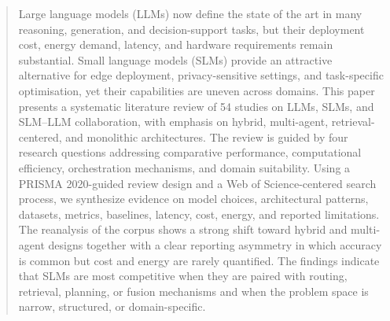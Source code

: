 \begin{abstract}
Large language models (LLMs) now define the state of the art in many reasoning, generation, and decision-support tasks, but their deployment cost, energy demand, latency, and hardware requirements remain substantial. Small language models (SLMs) provide an attractive alternative for edge deployment, privacy-sensitive settings, and task-specific optimisation, yet their capabilities are uneven across domains. This paper presents a systematic literature review of 54 studies on LLMs, SLMs, and SLM--LLM collaboration, with emphasis on hybrid, multi-agent, retrieval-centered, and monolithic architectures. The review is guided by four research questions addressing comparative performance, computational efficiency, orchestration mechanisms, and domain suitability. Using a PRISMA 2020-guided review design and a Web of Science-centered search process, we synthesize evidence on model choices, architectural patterns, datasets, metrics, baselines, latency, cost, energy, and reported limitations. The reanalysis of the corpus shows a strong shift toward hybrid and multi-agent designs together with a clear reporting asymmetry in which accuracy is common but cost and energy are rarely quantified. The findings indicate that SLMs are most competitive when they are paired with routing, retrieval, planning, or fusion mechanisms and when the problem space is narrow, structured, or domain-specific.

\end{abstract}
